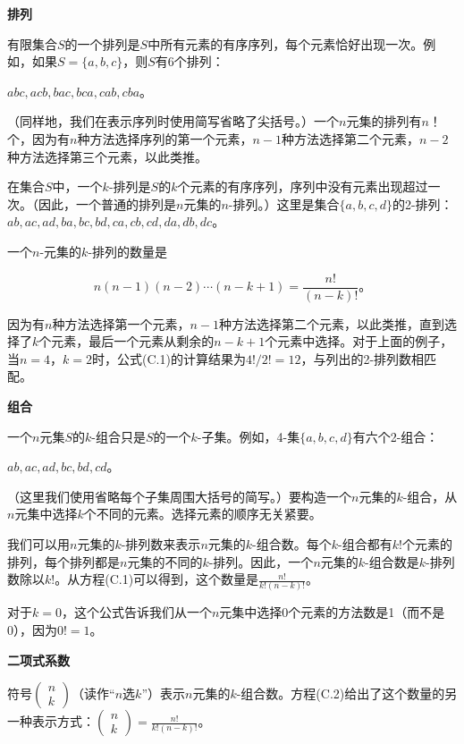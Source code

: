 \documentclass[lang=cn,newtx,10pt,scheme=chinese]{elegantbook}
\begin{document}
\textbf{排列}

有限集合$S$的一个排列是$S$中所有元素的有序序列，每个元素恰好出现一次。例如，如果$S=\{a,b,c\}$，则$S$有6个排列：

$a b c, a c b, b a c, b c a, c a b, c b a$。

（同样地，我们在表示序列时使用简写省略了尖括号。）一个$n$元集的排列有$n$！个，因为有$n$种方法选择序列的第一个元素，$n-1$种方法选择第二个元素，$n-2$种方法选择第三个元素，以此类推。

在集合$S$中，一个$k$-排列是$S$的$k$个元素的有序序列，序列中没有元素出现超过一次。（因此，一个普通的排列是$n$元集的$n$-排列。）这里是集合$\{a,b,c,d\}$的2-排列：$a b, a c, a d, b a, b c, b d, c a, c b, c d, d a, d b, d c$。

一个$n$-元集的$k$-排列的数量是

$$
n(n-1)(n-2) \cdots(n-k+1)=\frac{n !}{(n-k) !} \text {。}
$$

因为有$n$种方法选择第一个元素，$n-1$种方法选择第二个元素，以此类推，直到选择了$k$个元素，最后一个元素从剩余的$n-k+1$个元素中选择。对于上面的例子，当$n=4$，$k=2$时，公式(C.1)的计算结果为$4 ! / 2 !=12$，与列出的2-排列数相匹配。

\textbf{组合}

一个$n$元集$S$的$k$-组合只是$S$的一个$k$-子集。例如，4-集$\{a,b,c,d\}$有六个2-组合：

$a b, a c, a d, b c, b d, c d$。

（这里我们使用省略每个子集周围大括号的简写。）要构造一个$n$元集的$k$-组合，从$n$元集中选择$k$个不同的元素。选择元素的顺序无关紧要。

我们可以用$n$元集的$k$-排列数来表示$n$元集的$k$-组合数。每个$k$-组合都有$k !$个元素的排列，每个排列都是$n$元集的不同的$k$-排列。因此，一个$n$元集的$k$-组合数是$k$-排列数除以$k !$。从方程(C.1)可以得到，这个数量是$\frac{n !}{k !(n-k) !}$。

对于$k=0$，这个公式告诉我们从一个$n$元集中选择0个元素的方法数是1（而不是0），因为$0 !=1$。

\textbf{二项式系数}

符号$\left(\begin{array}{l}n \\ k\end{array}\right)$（读作“$n$选$k$”）表示$n$元集的$k$-组合数。方程(C.2)给出了这个数量的另一种表示方式：$\left(\begin{array}{l}n \\ k\end{array}\right)=\frac{n !}{k !(n-k) !}$。
\end{document}
